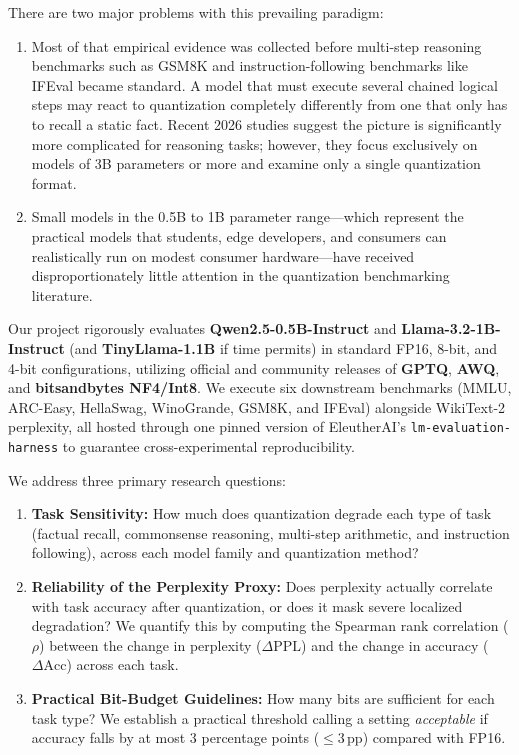 \documentclass[12pt, a4paper]{article}
\begin{document}
There are two major problems with this prevailing paradigm:
\begin{enumerate}[leftmargin=*]
    \item Most of that empirical evidence was collected before multi-step reasoning benchmarks such as GSM8K and instruction-following benchmarks like IFEval became standard. A model that must execute several chained logical steps may react to quantization completely differently from one that only has to recall a static fact. Recent 2026 studies suggest the picture is significantly more complicated for reasoning tasks; however, they focus exclusively on models of 3B parameters or more and examine only a single quantization format.
    \item Small models in the 0.5B to 1B parameter range---which represent the practical models that students, edge developers, and consumers can realistically run on modest consumer hardware---have received disproportionately little attention in the quantization benchmarking literature.
\end{enumerate}

Our project rigorously evaluates \textbf{Qwen2.5-0.5B-Instruct} and \textbf{Llama-3.2-1B-Instruct} (and \textbf{TinyLlama-1.1B} if time permits) in standard FP16, 8-bit, and 4-bit configurations, utilizing official and community releases of \textbf{GPTQ}, \textbf{AWQ}, and \textbf{bitsandbytes NF4/Int8}. We execute six downstream benchmarks (MMLU, ARC-Easy, HellaSwag, WinoGrande, GSM8K, and IFEval) alongside WikiText-2 perplexity, all hosted through one pinned version of EleutherAI's \texttt{lm-evaluation-harness} to guarantee cross-experimental reproducibility.

We address three primary research questions:
\begin{enumerate}[leftmargin=*]
    \item \textbf{Task Sensitivity:} How much does quantization degrade each type of task (factual recall, commonsense reasoning, multi-step arithmetic, and instruction following), across each model family and quantization method?
    \item \textbf{Reliability of the Perplexity Proxy:} Does perplexity actually correlate with task accuracy after quantization, or does it mask severe localized degradation? We quantify this by computing the Spearman rank correlation ($\rho$) between the change in perplexity ($\Delta\text{PPL}$) and the change in accuracy ($\Delta\text{Acc}$) across each task.
    \item \textbf{Practical Bit-Budget Guidelines:} How many bits are sufficient for each task type? We establish a practical threshold calling a setting \textit{acceptable} if accuracy falls by at most 3 percentage points ($\le 3\,\text{pp}$) compared with FP16.
\end{enumerate}
\end{document}
